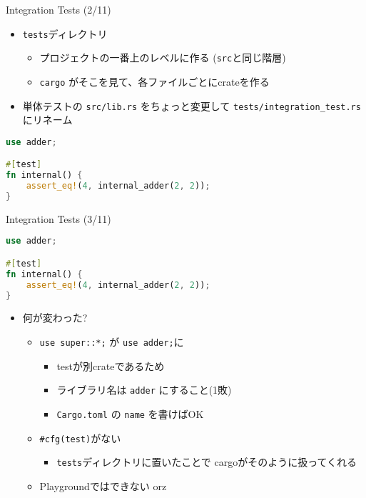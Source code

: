 \documentclass[cjk,14pt,xcolor=dvipsnames,table,dvipdfmx,professional font,t,fragile]{beamer}
\begin{document}
\begin{frame}[fragile]{Integration Tests (2/11)}
 \begin{itemize}
  \item \texttt{tests}ディレクトリ
	\begin{itemize}
	 \item プロジェクトの一番上のレベルに作る (\texttt{src}と同じ階層)
	 \item \texttt{cargo} がそこを見て、各ファイルごとにcrateを作る
	\end{itemize}
  \item 単体テストの \texttt{src/lib.rs} をちょっと変更して
	\texttt{tests/integration\_test.rs}にリネーム
 \end{itemize}
 {\scriptsize
 \begin{lstlisting}[language=Rust,style=boxed,style=colouredRust]
use adder;

#[test]
fn internal() {
    assert_eq!(4, internal_adder(2, 2));
}\end{lstlisting}}
\end{frame}

\begin{frame}[fragile]{Integration Tests (3/11)}
 \mbox{}
 {\scriptsize
 \begin{lstlisting}[language=Rust,style=boxed,style=colouredRust]
use adder;

#[test]
fn internal() {
    assert_eq!(4, internal_adder(2, 2));
}\end{lstlisting}}
\begin{itemize}
 \item 何が変わった?
       \begin{itemize}
	\item \verb|use super::*;| が \verb|use adder;|に
	      \begin{itemize}
	       \item testが別crateであるため
	       \item ライブラリ名は \texttt{adder} にすること(1敗)
	       \item \texttt{Cargo.toml} の \texttt{name} を書けばOK
	      \end{itemize}
	\item \verb|#cfg(test)|がない
	      \begin{itemize}
	       \item \texttt{tests}ディレクトリに置いたことで
		     cargoがそのように扱ってくれる
	      \end{itemize}
	      \pause
	\item Playgroundではできない orz
       \end{itemize}
\end{itemize}
\end{frame}
\end{document}
